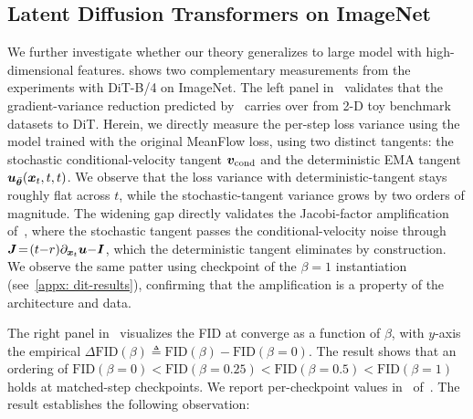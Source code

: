\subsection{Latent Diffusion Transformers on ImageNet}
\label{subsec: exp-dit}

We further investigate whether our theory generalizes to large model with high-dimensional features.  shows two complementary measurements from the experiments with DiT-B/4 on ImageNet. The left panel in~ validates that the gradient-variance reduction predicted by~ carries over from 2-D toy benchmark datasets to DiT. Herein, we directly measure the per-step loss variance using the model trained with the original MeanFlow loss, using two distinct tangents: the stochastic conditional-velocity tangent ${\bm{v}}_{\text{cond}}$ and the deterministic EMA tangent ${\bm{u}}_{\bar{{\bm{\theta}}}}({\bm{x}}_{t},t,t)$. We observe that the loss variance with deterministic-tangent stays roughly flat across $t$, while the stochastic-tangent variance grows by two orders of magnitude. The widening gap directly validates the Jacobi-factor amplification of~, where the stochastic tangent passes the conditional-velocity noise through ${\bm{J}}\!=\!(t{-}r)\partial_{{\bm{x}}_{t}}{\bm{u}}{-}{\bm{I}}$, which the deterministic tangent eliminates by construction. We observe the same patter using checkpoint of the $\beta\!=\!1$ instantiation (see~\cref{appx: dit-results}), confirming that the amplification is a property of the architecture and data.

The right panel in~ visualizes the FID at converge as a function of $\beta$, with $y$-axis the empirical $\Delta\mathrm{FID}(\beta)\!\triangleq\!\mathrm{FID}(\beta)\!-\!\mathrm{FID}(\beta=0)$. The result shows that an ordering of $\mathrm{FID}(\beta\!=\!0)\!<\!\mathrm{FID}(\beta\!=\!0.25)\!<\!\mathrm{FID}(\beta\!=\!0.5)\!<\!\mathrm{FID}(\beta\!=\!1)$ holds at matched-step checkpoints. We report per-checkpoint values in~ of~. The result establishes the following observation:


